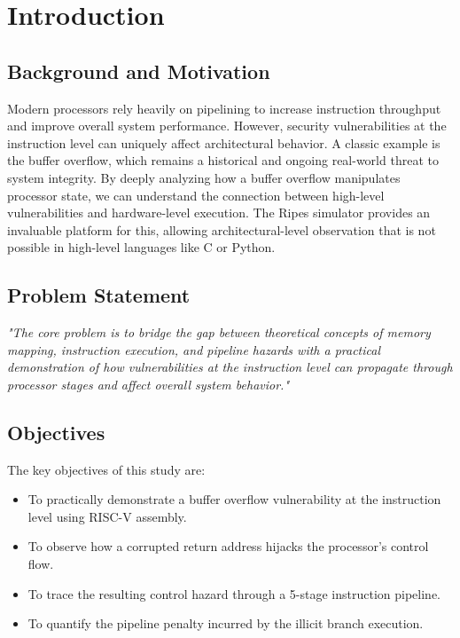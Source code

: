 \chapter{Introduction}

\section{Background and Motivation}
Modern processors rely heavily on pipelining to increase instruction throughput and improve overall system performance. However, security vulnerabilities at the instruction level can uniquely affect architectural behavior. A classic example is the buffer overflow, which remains a historical and ongoing real-world threat to system integrity. By deeply analyzing how a buffer overflow manipulates processor state, we can understand the connection between high-level vulnerabilities and hardware-level execution. The Ripes simulator provides an invaluable platform for this, allowing architectural-level observation that is not possible in high-level languages like C or Python.

\section{Problem Statement}
\textit{"The core problem is to bridge the gap between theoretical concepts of memory mapping, instruction execution, and pipeline hazards with a practical demonstration of how vulnerabilities at the instruction level can propagate through processor stages and affect overall system behavior."}

\section{Objectives}
The key objectives of this study are:
\begin{itemize}
    \item To practically demonstrate a buffer overflow vulnerability at the instruction level using RISC-V assembly.
    \item To observe how a corrupted return address hijacks the processor's control flow.
    \item To trace the resulting control hazard through a 5-stage instruction pipeline.
    \item To quantify the pipeline penalty incurred by the illicit branch execution.
\end{itemize}

